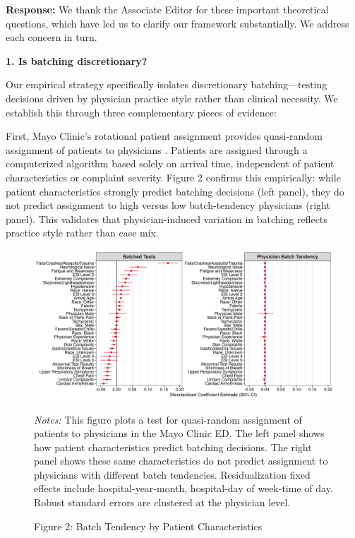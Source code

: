 \documentclass[11pt]{article}
\newcommand{\1}{\hbox{\rm 1\kern-.35em 1}}
\begin{document}
\noindent\textbf{Response:} \color{blue}We thank the Associate Editor for these important theoretical questions, which have led us to clarify our framework substantially. We address each concern in turn.

\textbf{1. Is batching discretionary?}

Our empirical strategy specifically isolates discretionary batching—testing decisions driven by physician practice style rather than clinical necessity. We establish this through three complementary pieces of evidence:

First, Mayo Clinic's rotational patient assignment provides quasi-random assignment of patients to physicians \citep{Traub2016, traub2016emergency, Traub2018}. Patients are assigned through a computerized algorithm based solely on arrival time, independent of patient characteristics or complaint severity. Figure 2 confirms this empirically: while patient characteristics strongly predict batching decisions (left panel), they do not predict assignment to high versus low batch-tendency physicians (right panel). This validates that physician-induced variation in batching reflects practice style rather than case mix.

\begin{figure}[h]
\centering
\caption*{Figure 2: Batch Tendency by Patient Characteristics}
\begin{threeparttable}
\includegraphics[width=\textwidth]{../outputs/figures/fig2_panel_batched_standardized.png}
    \begin{tablenotes}
        \small
        \item \textit{Notes:} This figure plots a test for quasi-random assignment of patients to physicians in the Mayo Clinic ED. The left panel shows how patient characteristics predict batching decisions. The right panel shows these same characteristics do not predict assignment to physicians with different batch tendencies. Residualization fixed effects include hospital-year-month, hospital-day of week-time of day. Robust standard errors are clustered at the physician level.
    \end{tablenotes}
\end{threeparttable}
\end{figure}
\end{document}
